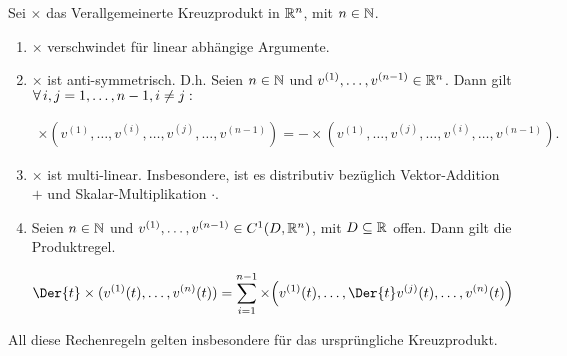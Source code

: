 \begin{lemma*}

Sei $\times$ das Verallgemeinerte Kreuzprodukt in $\mathbb{R}^n$, mit $n \in \mathbb{N}$.

\begin{enumerate}[label = (\roman*)]

  \item
  $\times$ verschwindet für linear abhängige Argumente.

  \item
  $\times$ ist anti-symmetrisch.
  D.h.
  Seien $n \in \mathbb{N}$ und $v^{(1)}, \ldots, v^{(n-1)} \in \mathbb{R}^n$.
  Dann gilt $\forall \, i, j = 1, \ldots, n-1, i \neq j:$

  \begin{align*}
    \times(v^{(1)}, \ldots, v^{(i)}, \ldots, v^{(j)}, \ldots, v^{(n-1)})
    =
    -
    \times(v^{(1)}, \ldots, v^{(j)}, \ldots, v^{(i)}, \ldots, v^{(n-1)}).
  \end{align*}

  \item
  $\times$ ist multi-linear.
  Insbesondere, ist es distributiv bezüglich Vektor-Addition $+$ und Skalar-Multiplikation $\cdot$.

  \item
  Seien $n \in \mathbb{N}$ und $v^{(1)}, \ldots, v^{(n-1)} \in C^1(D, \mathbb{R}^n)$, mit $D \subseteq \mathbb{R}$ offen.
  Dann gilt die Produktregel.

  \begin{align*}
    \Der{t}
    \times(v^{(1)}(t), \ldots, v^{(n)}(t))
    =
    \sum_{i=1}^{n-1}
    \times \pbraces
    {
      v^{(1)}(t),
      \ldots,
      \Der{t}
      v^{(j)}(t),
      \ldots,
      v^{(n)}(t)
    }
  \end{align*}

\end{enumerate}

All diese Rechenregeln gelten insbesondere für das ursprüngliche Kreuzprodukt.

\end{lemma*}

